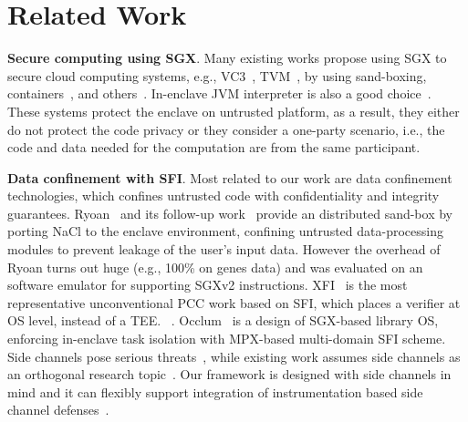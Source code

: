 \section{Related Work}\label{sec-relatedwork}

\vspace{3pt}\noindent\textbf{Secure computing using SGX}.
Many existing works propose using SGX to secure cloud computing systems, e.g., VC3~\cite{schuster2015vc3}, TVM~\cite{hynes2018efficient}, by using 
sand-boxing, containers~\cite{tian2019practical}, and others~\cite{shinde2017panoply,shanker2020evaluation}. 
In-enclave JVM interpreter is also a good choice~\cite{jiang2020uranus}. These systems protect the enclave on untrusted platform, as a result, they either do not protect the code privacy or they consider a one-party scenario, i.e., the code and data needed for the computation are from the same participant. 

\vspace{3pt}\noindent\textbf{Data confinement with SFI}.
Most related to our work are data confinement technologies, which confines untrusted code with confidentiality and integrity guarantees. Ryoan~\cite{hunt2018ryoan} and its follow-up work~\cite{hunt2018chiron} provide an distributed sand-box by porting NaCl to the enclave environment, confining untrusted data-processing modules to prevent leakage of the user’s input data. However the overhead of Ryoan turns out huge (e.g., 100\% on genes data) and was evaluated on an software emulator for supporting SGXv2 instructions.
XFI~\cite{erlingsson2006xfi} is the most representative unconventional PCC work based on SFI, which places a verifier at OS level, instead of a TEE. ~\cite{zhou2014armlock,tan2017principles}. Occlum~\cite{shen2020occlum} is
a design of SGX-based library OS, enforcing in-enclave task isolation with \DIFaddbegin {}\DIFaddend MPX-based multi-domain SFI scheme. 
Side channels pose serious threats~\cite{lee2017inferring,wang2017leaky,van2018foreshadow,chen2019sgxpectre}, while existing work assumes side channels as an orthogonal research topic~\cite{sinha2015moat,subramanyan2017formal,shen2020occlum}. 
Our framework is designed with side channels in mind and it can flexibly support integration of instrumentation based side channel defenses~\cite{shinde2016preventing,shih2017t,oleksenko2018varys,sinha2017compiler,chen2018racing}.

